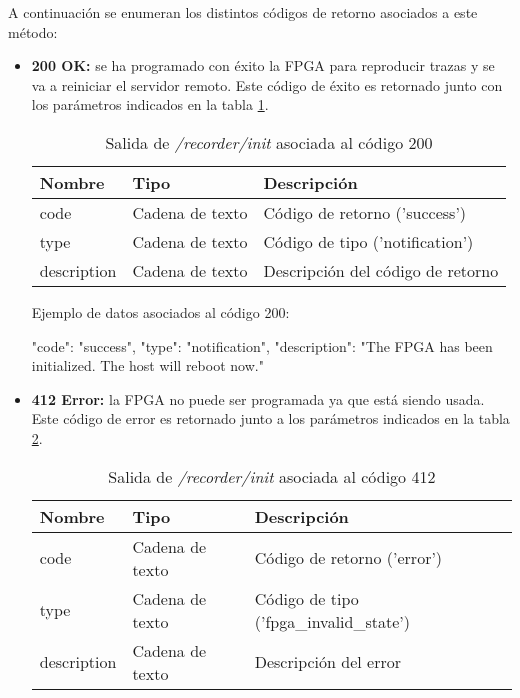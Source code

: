 A continuación se enumeran los distintos códigos de retorno asociados a este método:
\begin{itemize}

\item{\textbf{200 OK:} se ha programado con éxito la \gls{FPGA} para reproducir \glspl{traza} y se va a reiniciar el servidor remoto. Este código de éxito es retornado junto con los parámetros indicados en la tabla \ref{extra:api:recorderinit:ok}.
\begin{table}[H]
\centering
\begin{tabular}{|l|l|l|}
\hline
\rowcolor[HTML]{F5F5F5}
\textbf{Nombre}  & \textbf{Tipo}   & \textbf{Descripción}              \\ \hline
code             & Cadena de texto & Código de retorno ('success')     \\ \hline
type             & Cadena de texto & Código de tipo ('notification')   \\ \hline
description      & Cadena de texto & Descripción del código de retorno \\ \hline
\end{tabular}
\caption{Salida de \textit{/recorder/init} asociada al código 200}
\label{extra:api:recorderinit:ok}
\end{table}
\begin{minipage}{\textwidth}
Ejemplo de datos asociados al código 200:

\begin{code}[language=json]
{
  "code": "success",
  "type": "notification",
  "description": "The FPGA has been initialized. The host will reboot now."
}
\end{code}
\end{minipage}
}

\item{\textbf{412 Error:} la \gls{FPGA} no puede ser programada ya que está siendo usada. Este código de error es retornado junto a los parámetros indicados en la tabla \ref{extra:api:recorderinit:error}.
\begin{table}[H]
\centering
\begin{tabular}{|l|l|l|}
\hline
\rowcolor[HTML]{F5F5F5}
\textbf{Nombre}  & \textbf{Tipo}   & \textbf{Descripción}                    \\ \hline
code             & Cadena de texto & Código de retorno ('error')             \\ \hline
type             & Cadena de texto & Código de tipo ('fpga\_invalid\_state') \\ \hline
description      & Cadena de texto & Descripción del error                   \\ \hline
\end{tabular}
\caption{Salida de \textit{/recorder/init} asociada al código 412}
\label{extra:api:recorderinit:error}
\end{table}

}
\end{itemize}
